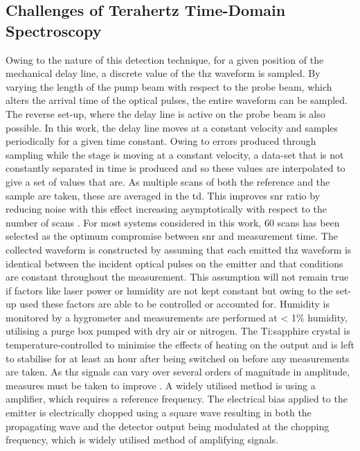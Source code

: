 \subsection{Challenges of Terahertz Time-Domain Spectroscopy}
Owing to the nature of this detection technique, for a given position of the mechanical delay line, a discrete value of the \acrshort{thz} waveform is sampled. By varying the length of the pump beam with respect to the probe beam, which alters the arrival time of the optical pulses, the entire waveform can be sampled. The reverse set-up, where the delay line is active on the probe beam is also possible. In this work, the delay line moves at a constant velocity and samples periodically for a given time constant. Owing to errors produced through sampling while the stage is moving at a constant velocity,  a data\nobreakdash-set that is not constantly separated in time is produced and so these values are interpolated to give a set of values that are. As multiple scans of both the reference and the sample are taken, these are averaged in the \acrshort{td}. This improves \acrshort{snr} ratio by reducing noise with this effect increasing asymptotically with respect to the number of scans \DIFdelbegin \DIFdel{~}\DIFdelend \cite{Popescu1996}. For most systems considered in this work, 60 scans has been selected as the optimum compromise between \acrshort{snr} and measurement time.
The collected waveform is constructed by assuming that each emitted \acrshort{thz} waveform is identical between the incident optical pulses on the emitter and that conditions are constant throughout the measurement. This assumption will not remain true if factors like laser power or humidity are not kept constant but owing to the set-up used these factors are able to be controlled or accounted for. Humidity is monitored by a hygrometer and measurements are performed at < 1\% humidity, utilising a purge box pumped with dry air or nitrogen. The Ti:sapphire crystal is temperature-controlled to minimise the effects of heating on the output and is left to stabilise for at least an hour after being switched on before any measurements are taken. 
As \acrshort{thz} signals can vary over several orders of magnitude in amplitude, measures must be taken to improve \DIFdelbegin %
\DIFdelend \DIFaddbegin {}\DIFaddend . A widely utilised method is using a \DIFdelbegin {}%
\DIFdelend \DIFaddbegin {}\DIFaddend amplifier, which requires a reference frequency. The electrical bias applied to the emitter is electrically chopped using a square wave resulting in both the propagating wave and the detector output being modulated at the chopping frequency, which is widely utilised method of amplifying signals.

